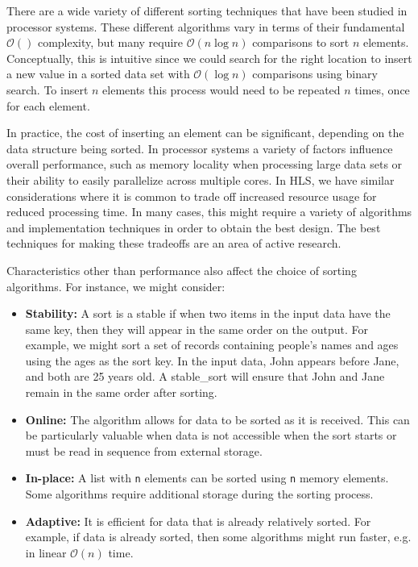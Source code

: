 There are a wide variety of different sorting techniques that have been studied in processor systems\cite{knuth1998art}.  These different algorithms vary in terms of their fundamental $\mathcal{O}()$ complexity, but many require $\mathcal{O}(n \log n)$ comparisons to sort $n$ elements.  Conceptually, this is intuitive since we could search for the right location to insert a new value in a sorted data set with $\mathcal{O}(\log n)$ comparisons using binary search. To insert $n$ elements this process would need to be repeated $n$ times, once for each element.

In practice, the cost of inserting an element can be significant, depending on the data structure being sorted.  In processor systems a variety of factors influence overall performance, such as memory locality when processing large data sets or their ability to easily parallelize across multiple cores.  In HLS, we have similar considerations where it is common to trade off increased resource usage for reduced processing time.  In many cases, this might require a variety of algorithms and implementation techniques in order to obtain the best design.  The best techniques for making these tradeoffs are an area of active research\cite{marcelino2008sorting,mueller2012sorting,matai2016sorting}.

Characteristics other than performance also affect the choice of sorting algorithms.  For instance, we might consider:
\begin{itemize}
\item \textbf{Stability:} A sort is a stable if when two items in the input data have the same key, then they will appear in the same order on the output. For example, we might sort a set of records containing people's names and ages using the ages as the sort key. In the input data, John appears before Jane, and both are 25 years old. A \gls{stable_sort} will ensure that John and Jane remain in the same order after sorting.  
\item \textbf{Online:} The algorithm allows for data to be sorted as it is received. This can be particularly valuable when data is not accessible when the sort starts or must be read in sequence from external storage. 
\item \textbf{In-place:} A list with \lstinline{n} elements can be sorted using \lstinline{n} memory elements. Some algorithms require additional storage during the sorting process.
\item \textbf{Adaptive:} It is efficient for data that is already relatively sorted. For example, if data is already sorted, then some algorithms might run faster, e.g. in linear $\mathcal{O}(n)$ time.
\end{itemize}

